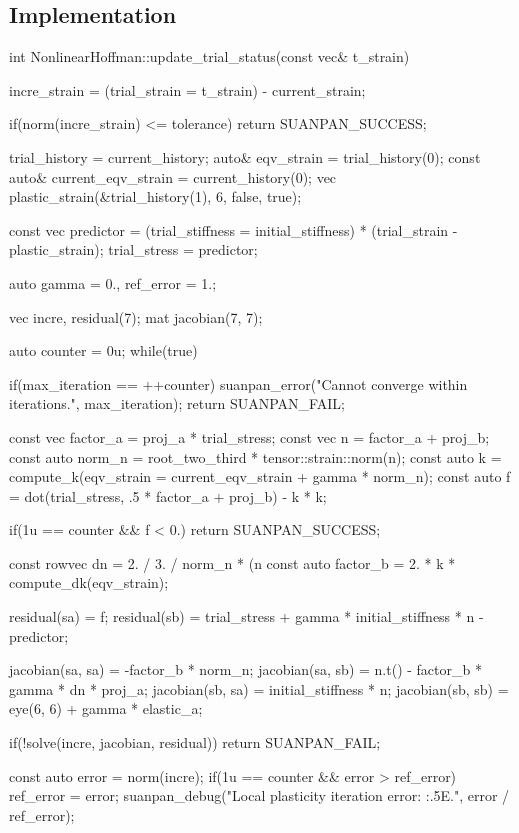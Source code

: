 \subsection{Implementation}
\begin{cppcode}
int NonlinearHoffman::update_trial_status(const vec& t_strain) {
    incre_strain = (trial_strain = t_strain) - current_strain;

    if(norm(incre_strain) <= tolerance) return SUANPAN_SUCCESS;

    trial_history = current_history;
    auto& eqv_strain = trial_history(0);
    const auto& current_eqv_strain = current_history(0);
    vec plastic_strain(&trial_history(1), 6, false, true);

    const vec predictor = (trial_stiffness = initial_stiffness) * (trial_strain - plastic_strain);
    trial_stress = predictor;

    auto gamma = 0., ref_error = 1.;

    vec incre, residual(7);
    mat jacobian(7, 7);

    auto counter = 0u;
    while(true) {
        if(max_iteration == ++counter) {
            suanpan_error("Cannot converge within {} iterations.\n", max_iteration);
            return SUANPAN_FAIL;
        }

        const vec factor_a = proj_a * trial_stress;
        const vec n = factor_a + proj_b;
        const auto norm_n = root_two_third * tensor::strain::norm(n);
        const auto k = compute_k(eqv_strain = current_eqv_strain + gamma * norm_n);
        const auto f = dot(trial_stress, .5 * factor_a + proj_b) - k * k;

        if(1u == counter && f < 0.) return SUANPAN_SUCCESS;

        const rowvec dn = 2. / 3. / norm_n * (n %
        const auto factor_b = 2. * k * compute_dk(eqv_strain);

        residual(sa) = f;
        residual(sb) = trial_stress + gamma * initial_stiffness * n - predictor;

        jacobian(sa, sa) = -factor_b * norm_n;
        jacobian(sa, sb) = n.t() - factor_b * gamma * dn * proj_a;
        jacobian(sb, sa) = initial_stiffness * n;
        jacobian(sb, sb) = eye(6, 6) + gamma * elastic_a;

        if(!solve(incre, jacobian, residual)) return SUANPAN_FAIL;

        const auto error = norm(incre);
        if(1u == counter && error > ref_error) ref_error = error;
        suanpan_debug("Local plasticity iteration error: {:.5E}.\n", error / ref_error);

}}
\end{cppcode}
